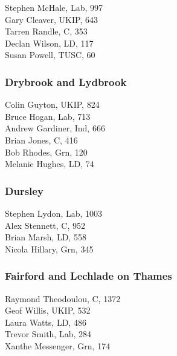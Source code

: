 \documentclass[a4paper,openany,10pt]{book}
\begin{document}


Stephen McHale, Lab, 997\\
Gary Cleaver, UKIP, 643\\
Tarren Randle, C, 353\\
Declan Wilson, LD, 117\\
Susan Powell, TUSC, 60\\


\subsubsection*{Drybrook and Lydbrook}



Colin Guyton, UKIP, 824\\
Bruce Hogan, Lab, 713\\
Andrew Gardiner, Ind, 666\\
Brian Jones, C, 416\\
Bob Rhodes, Grn, 120\\
Melanie Hughes, LD, 74\\


\subsubsection*{Dursley}



Stephen Lydon, Lab, 1003\\
Alex Stennett, C, 952\\
Brian Marsh, LD, 558\\
Nicola Hillary, Grn, 345\\


\subsubsection*{{Fairford and Lechlade on Thames}}



Raymond Theodoulou, C, 1372\\
Geof Willis, UKIP, 532\\
Laura Watts, LD, 486\\
Trevor Smith, Lab, 284\\
Xanthe Messenger, Grn, 174\\
\end{document}
